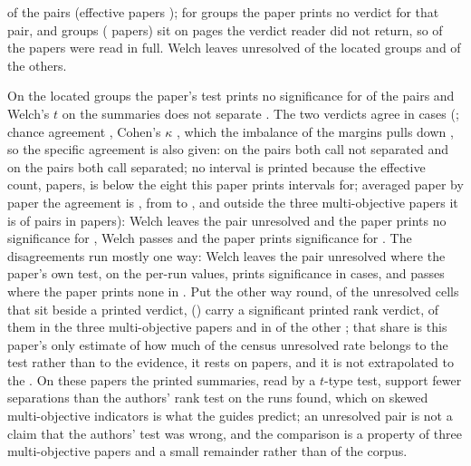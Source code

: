 \documentclass[preprint,review,12pt]{elsarticle}
\begin{document}
\nVcTopThreeShare{} of the pairs (effective papers \nVcEffectivePapers{}); for \nVcStatusVerdictNotPrinted{} groups the paper prints no verdict for that pair, and \nVcPageNotReadGroups{} groups (\nVcPageNotReadPapers{} papers) sit on pages the verdict reader did not return, so \nVcPapersFullyRead{} of the \nVcPapers{} papers were read in full. Welch leaves unresolved \nVcWelchFailAmongLocated{} of the located groups and \nVcWelchFailNotLocated{} of the \nVcNotLocated{} others.

On the located groups the paper's test prints no significance for \nVcPrintedNotSignificant{} of the pairs and Welch's $t$ on the summaries does not separate \nVcWelchFailAmongLocated{}. The two verdicts agree in \nVcAgree{} cases (\nVcPctAgree{}; chance agreement \nVcChanceAgreement{}, Cohen's $\kappa$ \nVcKappa{}, which the imbalance of the margins pulls down \cite{cicchetti1990high}, so the specific agreement is also given: \nVcSpecificAgreementFailNs{} on the pairs both call not separated and \nVcSpecificAgreementPassSig{} on the pairs both call separated; no interval is printed because the effective count, \nVcEffectivePapers{} papers, is below the eight this paper prints intervals for; averaged paper by paper the agreement is \nVcMacroAgreement{}, from \nVcPerPaperAgreementMin{} to \nVcPerPaperAgreementMax{}, and outside the three multi-objective papers it is \nVcWithoutTopThreeAgree{} of \nVcWithoutTopThreeN{} pairs in \nVcWithoutTopThreePapers{} papers): Welch leaves the pair unresolved and the paper prints no significance for \nVcWelchFailPrintedNotSignificant{}, Welch passes and the paper prints significance for \nVcWelchPassPrintedSignificant{}. The disagreements run mostly one way: Welch leaves the pair unresolved where the paper's own test, on the per-run values, prints significance in \nVcWelchFailPrintedSignificant{} cases, and passes where the paper prints none in \nVcWelchPassPrintedNotSignificant{}. Put the other way round, of the \nVcWelchFailLocated{} unresolved cells that sit beside a printed verdict, \nVcWelchFailPrintedSignificant{} (\nVcWelchFailPrintedSignificantPctOfFails{}) carry a significant printed rank verdict, \nVcWelchFailPrintedSignificantTopThree{} of them in the three multi-objective papers and \nVcWelchFailPrintedSignificantRest{} in \nVcWelchFailPrintedSignificantRestPapers{} of the other \nVcPapersOutsideTopThree{}; that share is this paper's only estimate of how much of the census unresolved rate belongs to the test rather than to the evidence, it rests on \nVcPapersLocated{} papers, and it is not extrapolated to the \nCrcAllTested{}. On these papers the printed summaries, read by a $t$-type test, support fewer separations than the authors' rank test on the runs found, which on skewed multi-objective indicators is what the guides predict; an unresolved pair is not a claim that the authors' test was wrong, and the comparison is a property of three multi-objective papers and a small remainder rather than of the corpus.
\end{document}

